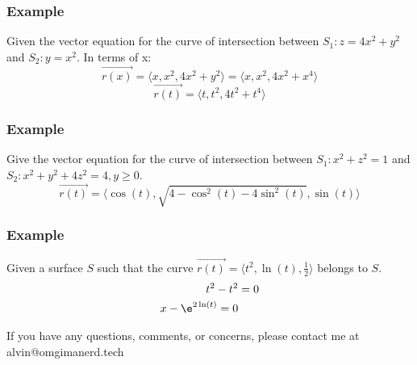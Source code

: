\documentclass[letterpaper, 12pt]{math}
\begin{document}
\subsubsection*{Example}
Given the vector equation for the curve of intersection between
\( S_1: z = 4x^2+y^2 \) and \( S_2: y = x^2 \). In terms of x:
\[ \vec{r(x)} = \langle x,x^2,4x^2+y^2\rangle = \langle x,x^2,4x^2+x^4\rangle \]
\[ \vec{r(t)} = \langle t,t^2,4t^2+t^4\rangle \]

\subsubsection*{Example}
Give the vector equation for the curve of intersection between
\( S_1: x^2+z^2 = 1 \) and \( S_2: x^2+y^2+4z^2 = 4, y\ge0 \).
\[ \vec{r(t)} = \langle\cos(t),\sqrt{4-\cos^2(t)-4\sin^2(t)},\sin(t)\rangle \]

\subsubsection*{Example}
Given a surface \( S \) such that the curve \( \vec{r(t)} = \langle t^2,\ln(t),
\frac{1}{2}\rangle \) belongs to \( S \).
\begin{align*}
  t^2-t^2 &= 0 \\
  x-\e^{2\ln(t)} = 0
\end{align*}

\begin{center}
  If you have any questions, comments, or concerns, please contact me at
  alvin@omgimanerd.tech
\end{center}
\end{document}
